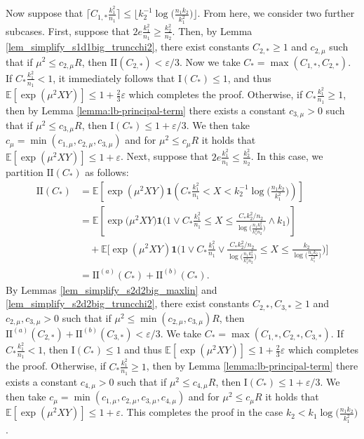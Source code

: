 \documentclass{article}
\newcommand{\EE}{\mathbb{E}}
\newcommand{\one}{\mathbf{1}}
\newcommand{\eps}{\varepsilon} %
\newcommand{\Ct}{C_{*}}
\begin{document}
Now suppose that $\lceil C_{1,*}\frac{k_1^2}{n_1}\rceil \leq \lfloor k_2^{-1}\log \big(\frac{n_1k_2}{k_1^2}\big)\rfloor$. From here, we consider two further subcases. First, suppose that $2e\frac{k_1^2}{n_1} \geq \frac{k_2^2}{n_2}$. Then, by Lemma \ref{lem_simplify_s1d1big_truncchi2}, there exist constants $C_{2,*} \geq 1$ and $c_{2,\mu}$ such that if $\mu^2 \leq c_{2,\mu}R$, then $\text{II}(C_{2,*}) < \eps/3$. Now we take $C_* = \max(C_{1,*}, C_{2,*})$. If $C_* \frac{k_1^2}{n_1} < 1$, it immediately follows that $\text{I}(C_*) \leq 1$, and thus $\EE[\exp(\mu^2XY)] \leq 1 + \frac23\eps$ which completes the proof. Otherwise, if $C_* \frac{k_1^2}{n_1} \geq 1$, then by Lemma \ref{lemma:lb-principal-term} there exists a constant $c_{3,\mu} > 0$ such that if $\mu^2 \leq c_{3,\mu}R$, then $\text{I}(C_*) \leq 1 + \eps/3$. We then take $c_\mu = \min(c_{1, \mu}, c_{2, \mu}, c_{3,\mu})$ and for $\mu^2 \leq c_{\mu}R$ it holds that $\EE[\exp(\mu^2XY)]\leq 1 + \eps$. Next, suppose that $2e\frac{k_1^2}{n_1} \leq \frac{k_2^2}{n_2}$. In this case, we partition $\text{II}(C_*)$ as follows:
\begin{align*}
    \text{II}(C_*) &= \EE[\exp(\mu^2XY)\one(\Ct \frac{k_1^2}{n_1} < X < k_2^{-1}\log\big(\frac{n_1k_2}{k_1^2}\big))] \\
    &= \EE\left[\exp\big(\mu^2XY\big)\one\bigg(1 \vee \Ct \frac{k_1^2}{n_1} \leq X \leq \frac{\Ct k_2^2/n_2}{\log\big(\frac{n_1k_2^2}{k_1^2n_2}\big)}\wedge k_1\bigg)\right] \\
    &\quad +\EE\bigg[\exp(\mu^2XY)\one\bigg( 1 \vee \Ct \frac{k_1^2}{n_1} \vee  \frac{\Ct k_2^2/n_2}{\log\big(\frac{n_1k_2^2}{k_1^2n_2}\big)} \leq X \leq \frac{k_2}{\log\big(\frac{n_1k_2}{k_1^2}\big)}\bigg)\bigg] \\
    &= \text{II}^{(a)}(C_*) + \text{II}^{(b)}(C_*).
\end{align*}
By Lemmas \ref{lem_simplify_s2d2big_maxlin} and \ref{lem_simplify_s2d2big_truncchi2}, there exist constants $C_{2,*}, C_{3,*} \geq 1$ and $c_{2,\mu}, c_{3,\mu} > 0$ such that if $\mu^2 \leq \min(c_{2,\mu}, c_{3,\mu})R$, then $\text{II}^{(a)}(C_{2,*}) + \text{II}^{(b)}(C_{3,*}) < \eps/3$. We take $C_* = \max(C_{1,*}, C_{2,*}, C_{3,*})$. If $C_* \frac{k_1^2}{n_1} < 1$, then $\text{I}(C_*) \leq 1$ and thus $\EE[\exp(\mu^2XY)] \leq 1 + \frac23\eps$ which completes the proof. Otherwise, if $C_* \frac{k_1^2}{n_1} \geq 1$, then by Lemma \ref{lemma:lb-principal-term} there exists a constant $c_{4,\mu} > 0$ such that if $\mu^2 \leq c_{4,\mu}R$, then $\text{I}(C_*) \leq 1 + \eps/3$. We then take $c_\mu = \min(c_{1, \mu}, c_{2, \mu}, c_{3,\mu}, c_{4,\mu})$ and for $\mu^2 \leq c_{\mu}R$ it holds that $\EE[\exp(\mu^2XY)]\leq 1 + \eps$. This completes the proof in the case $k_2 < k_1 \log \big(\frac{n_1k_2}{k_1^2}\big)$.
\end{document}
